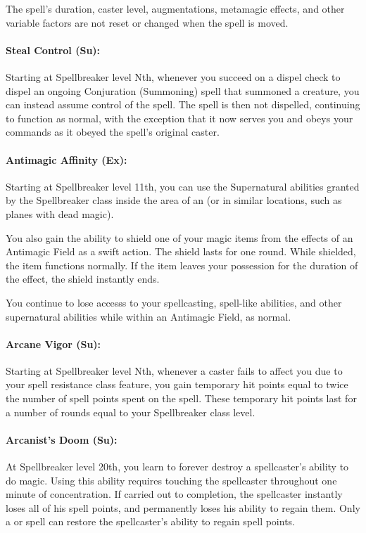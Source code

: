 The spell's duration, caster level, augmentations, metamagic effects, and other variable factors are not reset or changed when the spell is moved.
\paragraph{Steal Control (Su):} Starting at Spellbreaker level Nth, whenever you succeed on a dispel check to dispel an ongoing Conjuration (Summoning) spell that summoned a creature, you can instead assume control of the spell. The spell is then not dispelled, continuing to function as normal, with the exception that it now serves you and obeys your commands as it obeyed the spell's original caster.

\paragraph{Antimagic Affinity (Ex):} Starting at Spellbreaker level 11th, you can use the Supernatural abilities granted by the Spellbreaker class inside the area of an  (or in similar locations, such as planes with dead magic). 

You also gain the ability to shield one of your magic items from the effects of an Antimagic Field as a swift action. The shield lasts for one round. While shielded, the item functions normally. If the item leaves your possession for the duration of the effect, the shield instantly ends.

You continue to lose accesss to your spellcasting, spell-like abilities, and other supernatural abilities while within an Antimagic Field, as normal.
\paragraph{Arcane Vigor (Su):} Starting at Spellbreaker level Nth, whenever a caster fails to affect you due to your spell resistance class feature, you gain temporary hit points equal to twice the number of spell points spent on the spell. These temporary hit points last for a number of rounds equal to your Spellbreaker class level.

\paragraph{Arcanist's Doom (Su):} At Spellbreaker level 20th, you learn to forever destroy a spellcaster's ability to do magic.
Using this ability requires touching the spellcaster throughout one minute of concentration. If carried out to completion, the spellcaster instantly loses all of his spell points, and permanently loses his ability to regain them. Only a  or  spell can restore the spellcaster's ability to regain spell points.
